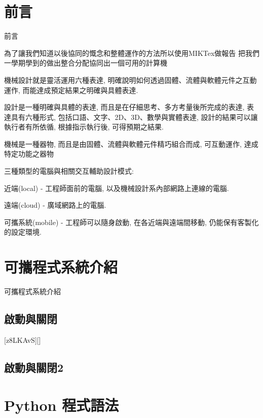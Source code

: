 \documentclass[12pt,,]{report}
\begin{document}
\mainmatter
\hypertarget{ux524dux8a00}{%
\chapter{前言}\label{ux524dux8a00}}

前言

為了讓我們知道以後協同的慨念和整體運作的方法所以使用MIKTex做報告
把我們一學期學到的做出整合分配協同出一個可用的計算機

機械設計就是靈活運用六種表達,
明確說明如何透過固體、流體與軟體元件之互動運作,
而能達成預定結果之明確與具體表達.

設計是一種明確與具體的表達, 而且是在仔細思考、多方考量後所完成的表達,
表達具有六種形式, 包括口語、文字、2D、3D、數學與實體表達,
設計的結果可以讓執行者有所依循, 根據指示執行後, 可得預期之結果.

機械是一種器物, 而且是由固體、流體與軟體元件精巧組合而成, 可互動運作,
達成特定功能之器物

三種類型的電腦與相關交互輔助設計模式:

近端(local) - 工程師面前的電腦, 以及機械設計系內部網路上連線的電腦.

遠端(cloud) - 廣域網路上的電腦.

可攜系統(mobile) - 工程師可以隨身啟動, 在各近端與遠端間移動,
仍能保有客製化的設定環境.

\hypertarget{ux53efux651cux7a0bux5f0fux7cfbux7d71ux4ecbux7d39}{%
\chapter{可攜程式系統介紹}\label{ux53efux651cux7a0bux5f0fux7cfbux7d71ux4ecbux7d39}}

可攜程式系統介紹

\hypertarget{ux555fux52d5ux8207ux95dcux9589}{%
\section{啟動與關閉}\label{ux555fux52d5ux8207ux95dcux9589}}

{[}z8LKAvS{]}{[}{]}

\hypertarget{ux555fux52d5ux8207ux95dcux95892}{%
\section{啟動與關閉2}\label{ux555fux52d5ux8207ux95dcux95892}}

\hypertarget{python-ux7a0bux5f0fux8a9eux6cd5}{%
\chapter{Python 程式語法}\label{python-ux7a0bux5f0fux8a9eux6cd5}}
\end{document}
